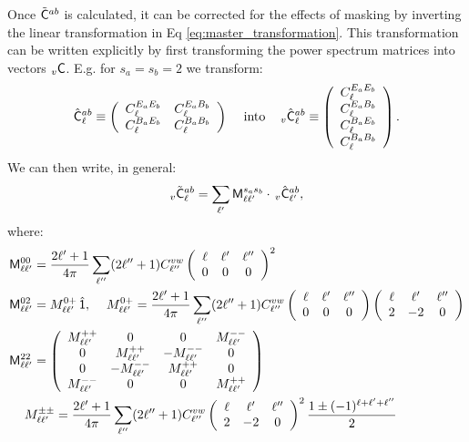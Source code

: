 \documentclass[a4paper,10pt]{article}
\newcommand{\wtj}[6]{\left(\begin{array}{ccc} #1 & #2 & #3\\#4 & #5 & #6\end{array} \right)}
\begin{document}
    Once $\tilde{\sf C}^{ab}$ is calculated, it can be corrected for the effects of masking by inverting the linear transformation in Eq \ref{eq:master_transformation}. This transformation can be written explicitly by first transforming the power spectrum matrices into vectors $_v{\sf C}$. E.g. for $s_a=s_b=2$ we transform:
    \begin{equation}
      \hat{\sf C}^{ab}_\ell\equiv\left(
      \begin{array}{cc}
        C^{E_aE_b}_\ell & C^{E_aB_b}_\ell \\
        C^{B_aE_b}_\ell & C^{B_aB_b}_\ell
      \end{array}\right)
      \hspace{12pt}\text{into}\hspace{12pt}
      _v\hat{\sf C}^{ab}_\ell\equiv\left(
      \begin{array}{c}
        C^{E_aE_b}_\ell\\
        C^{E_aB_b}_\ell\\
        C^{B_aE_b}_\ell\\
        C^{B_aB_b}_\ell
      \end{array}\right).
    \end{equation}
    We can then write, in general:
    \begin{equation}\label{eq:cell_coupled}
      _v\tilde{\sf C}^{ab}_\ell=\sum_{\ell'}{\sf M}^{s_as_b}_{\ell\ell'}\cdot\,_v\hat{\sf C}^{ab}_{\ell'},
    \end{equation}
    where:
    \begin{align}
      &{\sf M}^{00}_{\ell\ell'}=\frac{2\ell'+1}{4\pi}\sum_{\ell''}(2\ell''+1)C^{vw}_{\ell''}\wtj{\ell}{\ell'}{\ell''}{0}{0}{0}^2\\
      &{\sf M}^{02}_{\ell\ell'}=M^{0+}_{\ell\ell'}\,\hat{\sf 1},
      \hspace{12pt}
      M^{0+}_{\ell\ell'}=\frac{2\ell'+1}{4\pi}\sum_{\ell''}(2\ell''+1)C^{vw}_{\ell''}\wtj{\ell}{\ell'}{\ell''}{0}{0}{0}\wtj{\ell}{\ell'}{\ell''}{2}{-2}{0}\\
      &{\sf M}^{22}_{\ell\ell'}=\left(
      \begin{array}{cccc}
        M^{++}_{\ell\ell'} &0 &0&M^{--}_{\ell\ell'}\\
        0&M^{++}_{\ell\ell'} &-M^{--}_{\ell\ell'}&0\\
        0&-M^{--}_{\ell\ell'} &M^{++}_{\ell\ell'}&0\\
        M^{--}_{\ell\ell'} &0 &0&M^{++}_{\ell\ell'}
      \end{array}\right)\\
      & \hspace{12pt}M^{\pm\pm}_{\ell\ell'}=\frac{2\ell'+1}{4\pi}\sum_{\ell''}(2\ell''+1)C^{vw}_{\ell''}\wtj{\ell}{\ell'}{\ell''}{2}{-2}{0}^2\frac{1\pm(-1)^{\ell+\ell'+\ell''}}{2}
    \end{align}
    
\end{document}
